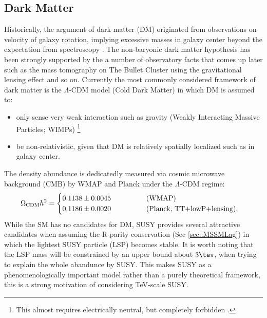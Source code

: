 \subsection{Dark Matter}
Historically, the argument of dark matter (DM) originated from observations on velocity of galaxy rotation, implying excessive masses in galaxy center beyond the expectation from spectroscopy \cite{DMGallaxyRotation1,DMGallaxyRotation2}. 
The non-baryonic dark matter hypothesis has been strongly supported by the a number of observatory facts that comes up later such as the mass tomography on The Bullet Cluster using the gravitational lensing effect and so on. 
Currently the most commonly considered framework of dark matter is the $\Lambda$-CDM model (Cold Dark Matter) in which DM is assumed to:
\begin{itemize}
\item only sense very weak interaction such as gravity (Weakly Interacting Massive Particles; WIMPs) 
\footnote{This almost requires electrically neutral, but completely forbidden \cite{chargedDM}.}
\item be non-relativistic, given that DM is relatively spatially localized such as in galaxy center.
\end{itemize}
The density abundance is dedicatedly measured via cosmic microwave background (CMB) by WMAP \cite{WMAP2013} and Planck \cite{Planck2015} under the $\Lambda$-CDM regime:
\begin{align}
\Omega_{\mathrm{CDM}} h^2 = 
\begin{cases}
  0.1138 \pm 0.0045 \mbox{\phantom{MMMMM} (WMAP)} \\
  0.1186 \pm 0.0020 \mbox{\phantom{MMMMM} (Planck, TT+lowP+lensing)},
\label{eq::obsDMRelic}
\end{cases}
\end{align}
While the SM has no candidates for DM, SUSY provides several attractive candidates when assuming the R-parity conservation (Sec \ref{sec::MSSMLag}) in which the lightest SUSY particle (LSP) becomes stable. It is worth noting that the LSP mass will be constrained by an upper bound about $3\tev$, when trying to explain the whole abandunce by SUSY. 
This makes SUSY as a phenomenologically important model rather than a purely theoretical framework,
this is a strong motivation of considering TeV-scale SUSY. \\

